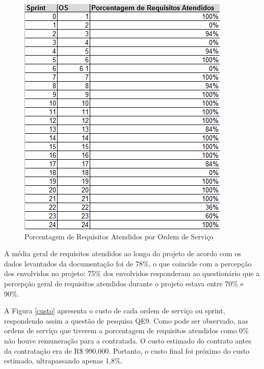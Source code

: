 \begin{figure}[H]
		\centering
			\includegraphics[scale=1.0]{figuras/porcentagemrequisitos.png}
		\caption{Porcentagem de Requisitos Atendidos por Ordem de Serviço}
		\label{porcentagemrequisitos}
\end{figure}

\textcolor{red}{}

 A média geral de requisitos atendidos ao longo do projeto de acordo com os dados levantados da documentação foi de 78\%, o que coincide com a percepção dos envolvidos no projeto: 75\% dos envolvidos responderam ao questionário que a percepção geral de requisitos atendidos durante o projeto estava entre 70\% e 90\%.

A Figura \ref{custo} apresenta o custo de cada ordem de serviço ou sprint, respondendo assim a questão de pesquisa QE9. Como pode ser observado, nas ordens de serviço que tiverem a porcentagem de requisitos atendidos como 0\% não houve remuneração para a contratada. O custo estimado do contrato antes da contratação era de R\$ 990,000. Portanto, o custo final foi próximo do custo estimado, ultrapassando apenas 1,8\%.

\textcolor{red}{}

